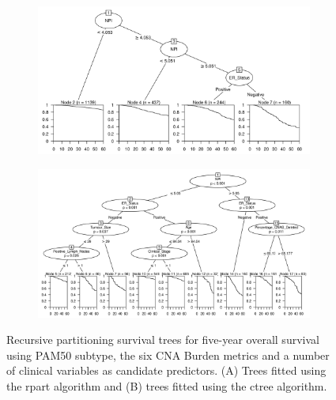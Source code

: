 \begin{figure}[!htb]
\centering

\vspace{1cm}

\begin{subfigure}{\textwidth}
\subcaption{}
\includegraphics[width=1\textwidth]{../figures/Appendices/Appendix_B/Clin_PartyKit_Survival_Burden_FiveYearOS_PAM50.png}
\end{subfigure}

\vspace{2cm}

\begin{subfigure}{\textwidth}
\subcaption{}
\includegraphics[width=1\textwidth]{../figures/Appendices/Appendix_B/Clin_Ctree_Survival_Burden_FiveYearOS_PAM50.png}
\end{subfigure}

\vspace{1cm}

\caption[Recursive partitioning survival trees for five-year overall survival using PAM50 subtype, the six CNA Burden metrics and a number of clinical variables as candidate predictors.]{Recursive partitioning survival trees for five-year overall survival using PAM50 subtype, the six CNA Burden metrics and a number of clinical variables as candidate predictors. (A) Trees fitted using the rpart algorithm and (B) trees fitted using the ctree algorithm.}
\end{figure}

